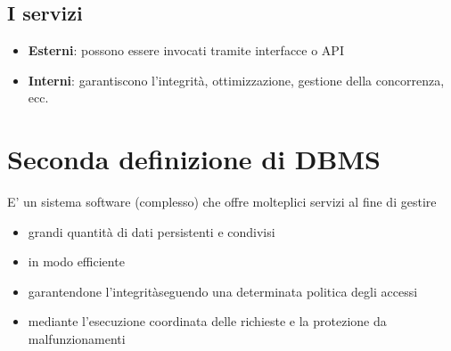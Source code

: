 \documentclass[12pt]{article}
\begin{document}
\subsection{I servizi}
\begin{itemize}
    \item \textbf{Esterni}: possono essere invocati tramite interfacce o API
    \item \textbf{Interni}: garantiscono l'integrità, ottimizzazione, gestione della concorrenza, ecc.
\end{itemize}
\section{Seconda definizione di DBMS}
E' un sistema software (complesso) che offre molteplici servizi al fine di gestire
\begin{itemize}
    \item grandi quantità di dati persistenti e condivisi
    \item in modo efficiente
    \item garantendone l'integritàseguendo una determinata politica degli accessi
    \item mediante l'esecuzione coordinata delle richieste e la protezione da malfunzionamenti
\end{itemize}
\end{document}
